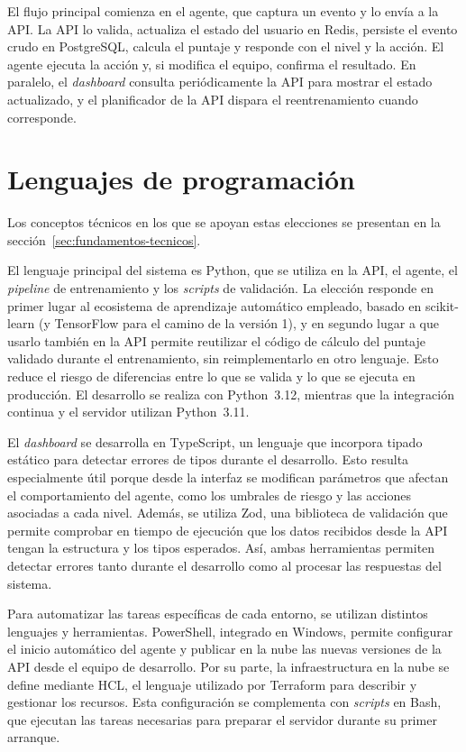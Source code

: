 El flujo principal comienza en el agente, que captura un evento y lo envía a la API. La API lo valida, actualiza el estado del usuario en Redis, persiste el evento crudo en PostgreSQL, calcula el puntaje y responde con el nivel y la acción. El agente ejecuta la acción y, si modifica el equipo, confirma el resultado. En paralelo, el \emph{dashboard} consulta periódicamente la API para mostrar el estado actualizado, y el planificador de la API dispara el reentrenamiento cuando corresponde.

\section{Lenguajes de programación}
\label{sec:lenguajes}
Los conceptos técnicos en los que se apoyan estas elecciones se presentan en la sección~\ref{sec:fundamentos-tecnicos}.

El lenguaje principal del sistema es Python, que se utiliza en la API, el agente, el \emph{pipeline} de entrenamiento y los \emph{scripts} de validación. La elección responde en primer lugar al ecosistema de aprendizaje automático empleado, basado en scikit-learn (y TensorFlow para el camino de la versión 1), y en segundo lugar a que usarlo también en la API permite reutilizar el código de cálculo del puntaje validado durante el entrenamiento, sin reimplementarlo en otro lenguaje. Esto reduce el riesgo de diferencias entre lo que se valida y lo que se ejecuta en producción. El desarrollo se realiza con Python~3.12, mientras que la integración continua y el servidor utilizan Python~3.11.

El \emph{dashboard} se desarrolla en TypeScript, un lenguaje que incorpora tipado estático para detectar errores de tipos durante el desarrollo. Esto resulta especialmente útil porque desde la interfaz se modifican parámetros que afectan el comportamiento del agente, como los umbrales de riesgo y las acciones asociadas a cada nivel. Además, se utiliza Zod, una biblioteca de validación que permite comprobar en tiempo de ejecución que los datos recibidos desde la API tengan la estructura y los tipos esperados. Así, ambas herramientas permiten detectar errores tanto durante el desarrollo como al procesar las respuestas del sistema.

Para automatizar las tareas específicas de cada entorno, se utilizan distintos lenguajes y herramientas. PowerShell, integrado en Windows, permite configurar el inicio automático del agente y publicar en la nube las nuevas versiones de la API desde el equipo de desarrollo. Por su parte, la infraestructura en la nube se define mediante HCL, el lenguaje utilizado por Terraform para describir y gestionar los recursos. Esta configuración se complementa con \emph{scripts} en Bash, que ejecutan las tareas necesarias para preparar el servidor durante su primer arranque.

